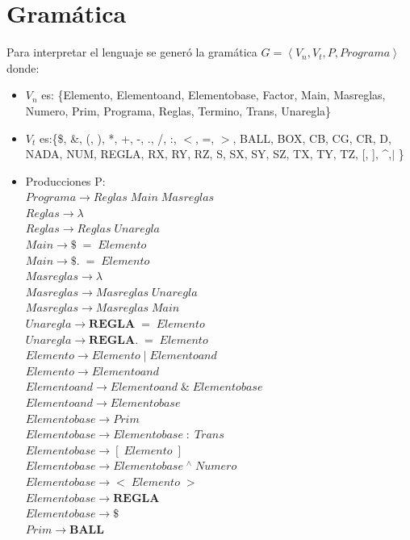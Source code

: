 \documentclass[10pt,a4paper]{article}
\begin{document}
\section{Gramática}
Para interpretar el lenguaje se generó la gramática $G = \left<{V_n,V_t,P,Programa}\right>$ donde:
\begin{itemize}
\item $V_n$ es: \{Elemento, Elementoand, Elementobase, Factor, Main, Masreglas, Numero, Prim, Programa, Reglas, Termino, Trans, Unaregla\}
\item $V_t$ es:\{\$, \&, (, ), *, +, -, ., /, :, $<$, =, $>$, BALL, BOX, CB, CG, CR, D, NADA, NUM, REGLA, RX, RY, RZ, S, SX, SY, SZ, TX, TY, TZ, [, ], \^{},$\vert$ \}
\item Producciones P:\\
$Programa\rightarrow{}Reglas\;Main\;Masreglas$\\
$Reglas\rightarrow{}\lambda$\\
$Reglas\rightarrow{}Reglas\;Unaregla$\\
$Main\rightarrow{}\$\;=\;Elemento$\\
$Main\rightarrow{}\$.\;=\;Elemento$\\
$Masreglas\rightarrow{}\lambda$\\
$Masreglas\rightarrow{}Masreglas\;Unaregla$\\
$Masreglas\rightarrow{}Masreglas\;Main$\\
$Unaregla\rightarrow{}\textbf{REGLA}\;=\;Elemento$\\
$Unaregla\rightarrow{}\textbf{REGLA.}\;=\;Elemento$\\
$Elemento\rightarrow{}Elemento\;|\;Elementoand$\\
$Elemento\rightarrow{}Elementoand$\\
$Elementoand\rightarrow{}Elementoand\;\&\;Elementobase$\\
$Elementoand\rightarrow{}Elementobase$\\
$Elementobase\rightarrow{}Prim$\\
$Elementobase\rightarrow{}Elementobase\;:\;Trans$\\
$Elementobase\rightarrow{}[\;Elemento\;]$\\
$Elementobase\rightarrow{}Elementobase\;{}^\wedge\;Numero$\\
$Elementobase\rightarrow{}<\;Elemento\;>$\\
$Elementobase\rightarrow{}\textbf{REGLA}$\\
$Elementobase\rightarrow{}\$$\\
$Prim\rightarrow{}\textbf{BALL}$\\

\end{itemize}
\end{document}
